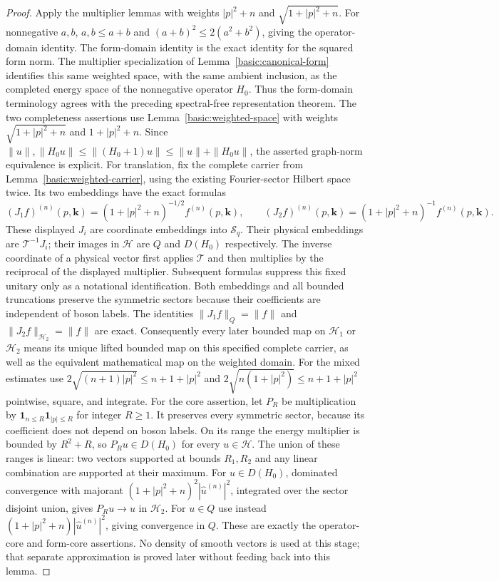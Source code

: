\documentclass[11pt,a4paper]{article}
\theoremstyle{definition}
\theoremstyle{remark}
\begin{document}
\begin{proof}
Apply the multiplier lemmas with weights $|p|^2+n$ and
$\sqrt{1+|p|^2+n}$. For nonnegative $a,b$, $a,b\leq a+b$ and
$(a+b)^2\leq2(a^2+b^2)$, giving the operator-domain identity. The
form-domain identity is the exact identity for the squared form norm.
The multiplier specialization of Lemma~\ref{basic:canonical-form}
identifies this same weighted space, with the same ambient inclusion,
as the completed energy space of the nonnegative operator $H_0$.
Thus the form-domain terminology agrees with the preceding
spectral-free representation theorem.
The two completeness assertions use Lemma~\ref{basic:weighted-space}
with weights $\sqrt{1+|p|^2+n}$ and $1+|p|^2+n$. Since
$\|u\|,\|H_0u\|\leq\|(H_0+1)u\|\leq\|u\|+\|H_0u\|$,
the asserted graph-norm equivalence is explicit.
For translation, fix the complete carrier from
Lemma~\ref{basic:weighted-carrier}, using the existing Fourier-sector
Hilbert space twice. Its two embeddings have the exact formulas
\[
 (J_1f)^{(n)}(p,\mathbf k)
   =(1+|p|^2+n)^{-1/2}f^{(n)}(p,\mathbf k),\qquad
 (J_2f)^{(n)}(p,\mathbf k)
   =(1+|p|^2+n)^{-1}f^{(n)}(p,\mathbf k).
\]
These displayed $J_i$ are coordinate embeddings into $\mathcal S_q$.
Their physical embeddings are $\mathcal T^{-1}J_i$; their images in
$\mathcal H$ are $Q$ and $D(H_0)$ respectively. The inverse coordinate
of a physical vector first applies $\mathcal T$ and then multiplies
by the reciprocal of the displayed multiplier. Subsequent formulas
suppress this fixed unitary only as a notational identification. Both
embeddings and all bounded truncations preserve the symmetric
sectors because their coefficients are independent of boson labels.
The identities $\|J_1f\|_Q=\|f\|$ and
$\|J_2f\|_{\mathcal H_2}=\|f\|$ are exact. Consequently every
later bounded map on $\mathcal H_1$ or $\mathcal H_2$ means its
unique lifted bounded map on this specified complete carrier, as
well as the equivalent mathematical map on the weighted domain.
For the mixed estimates use $2\sqrt{(n+1)|p|^2}\leq n+1+|p|^2$ and
$2\sqrt{n(1+|p|^2)}\leq n+1+|p|^2$ pointwise, square, and integrate.
For the core assertion, let $P_R$ be multiplication by
$\mathbf1_{n\leq R}\mathbf1_{|p|\leq R}$ for integer $R\geq1$.
It preserves every symmetric sector, because its coefficient does not
depend on boson labels. On its range the energy multiplier is bounded
by $R^2+R$, so $P_Ru\in D(H_0)$ for every $u\in\mathcal H$.
The union of these ranges is linear: two vectors supported at bounds
$R_1,R_2$ and any linear combination are supported at their maximum.
For $u\in D(H_0)$, dominated convergence with majorant
$(1+|p|^2+n)^2|\widehat u^{(n)}|^2$, integrated over the sector
disjoint union, gives $P_Ru\to u$ in $\mathcal H_2$. For $u\in Q$
use instead $(1+|p|^2+n)|\widehat u^{(n)}|^2$, giving convergence
in $Q$. These are exactly the operator-core and form-core assertions.
No density of smooth vectors is used at this stage; that separate
approximation is proved later without feeding back into this lemma.
\end{proof}
\end{document}

